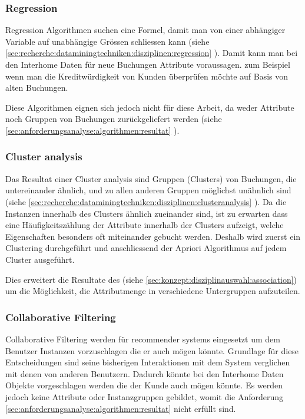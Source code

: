 \subsubsection{Regression}
\label{sec:konzept:disziplinauswahl:regression}
Regression Algorithmen suchen eine Formel, damit man von einer abhängiger Variable auf unabhängige Grössen schliessen kann (siehe \cref{sec:recherche:dataminingtechniken:disziplinen:regression} ). Damit kann man bei den Interhome Daten für neue Buchungen Attribute voraussagen. zum Beispiel wenn man die Kreditwürdigkeit von Kunden überprüfen möchte auf Basis von alten Buchungen.

Diese Algorithmen eignen sich jedoch nicht für diese Arbeit, da weder Attribute noch Gruppen von Buchungen zurückgeliefert werden (siehe \cref{sec:anforderungsanalyse:algorithmen:resultat} ).

\subsubsection{Cluster analysis}
\label{sec:konzept:disziplinauswahl:clusteranalysis}
Das Resultat einer Cluster analysis sind Gruppen (Clusters) von Buchungen, die untereinander ähnlich, und zu allen anderen Gruppen möglichst unähnlich sind (siehe \cref{sec:recherche:dataminingtechniken:disziplinen:clusteranalysis} ). Da die Instanzen innerhalb des Clusters ähnlich zueinander sind, ist zu erwarten dass eine Häufigkeitszählung der Attribute innerhalb der Clusters aufzeigt, welche Eigenschaften besonders oft miteinander gebucht werden. Deshalb wird zuerst ein Clustering durchgeführt und anschliessend der Apriori Algorithmus auf jedem Cluster ausgeführt. 

Dies erweitert die Resultate des  (siehe \cref{sec:konzept:disziplinauswahl:association}) um die Möglichkeit, die Attributmenge in verschiedene Untergruppen aufzuteilen.

\subsubsection{Collaborative Filtering}
\label{sec:konzept:disziplinauswahl:collaborativefiltering}
Collaborative Filtering werden für recommender systems eingesetzt um dem Benutzer Instanzen vorzuschlagen die er auch mögen könnte. Grundlage für diese Entscheidungen sind seine bisherigen Interaktionen mit dem System verglichen mit denen von anderen Benutzern. Dadurch könnte bei den Interhome Daten Objekte vorgeschlagen werden die der Kunde auch mögen könnte. Es werden jedoch keine Attribute oder Instanzgruppen gebildet, womit die Anforderung \cref{sec:anforderungsanalyse:algorithmen:resultat} nicht erfüllt sind.


